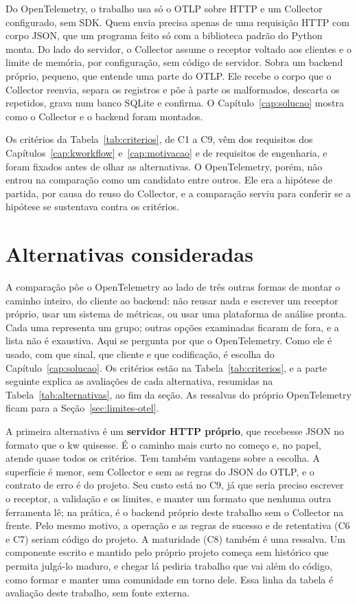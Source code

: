 Do OpenTelemetry, o trabalho usa só o OTLP sobre HTTP e um Collector
configurado, sem SDK. Quem envia precisa apenas de uma requisição HTTP com
corpo JSON, que um programa feito só com a biblioteca padrão do Python monta.
Do lado do servidor, o Collector assume o receptor voltado aos clientes e o
limite de memória, por configuração, sem código de servidor. Sobra um backend
próprio, pequeno, que entende uma parte do OTLP. Ele recebe o corpo que o Collector
reenvia, separa os registros e põe à parte os malformados, descarta os
repetidos, grava num banco SQLite e confirma. O Capítulo~\ref{cap:solucao}
mostra como o Collector e o backend foram montados.

Os critérios da Tabela~\ref{tab:criterios}, de C1 a C9, vêm dos requisitos dos
Capítulos~\ref{cap:kworkflow} e~\ref{cap:motivacao} e de requisitos de
engenharia, e foram fixados antes de olhar as alternativas. O
OpenTelemetry, porém, não entrou na comparação como um candidato entre
outros. Ele era a hipótese de partida, por causa do reuso do Collector, e a
comparação serviu para conferir se a hipótese se sustentava contra os
critérios.



\section{Alternativas consideradas}
\label{sec:alternativas}

A comparação põe o OpenTelemetry ao lado de três outras formas de montar o
caminho inteiro, do cliente ao backend: não reusar nada e escrever um
receptor próprio, usar um sistema de métricas, ou usar uma plataforma de
análise pronta. Cada uma representa um grupo; outras opções examinadas
ficaram de fora, e a lista não é exaustiva. Aqui se pergunta por que o
OpenTelemetry. Como ele é usado, com que sinal, que cliente e que
codificação, é escolha do Capítulo~\ref{cap:solucao}. Os critérios estão na
Tabela~\ref{tab:criterios}, e a parte seguinte explica as avaliações de cada
alternativa, resumidas na Tabela~\ref{tab:alternativas}, ao fim da seção. As
ressalvas do próprio OpenTelemetry ficam para a Seção~\ref{sec:limites-otel}.


A primeira alternativa é um \textbf{servidor HTTP próprio}, que recebesse JSON
no formato que o kw quisesse. É o caminho mais curto no começo e, no papel,
atende quase todos os critérios. Tem também vantagens sobre a escolha. A
superfície é menor, sem Collector e sem as regras do JSON do OTLP, e o
contrato de erro é do projeto. Seu custo está no C9, já que seria preciso escrever o
receptor, a validação e os limites, e manter um formato que nenhuma outra
ferramenta lê; na prática, é o backend próprio deste trabalho sem o Collector
na frente. Pelo mesmo motivo, a operação e as regras de sucesso e de
retentativa (C6 e C7) seriam código do projeto. A maturidade (C8) também é uma
ressalva. Um componente escrito e mantido pelo próprio projeto começa sem
histórico que permita julgá-lo maduro, e chegar lá pediria trabalho que vai
além do código, como formar e manter uma comunidade em torno dele. Essa linha
da tabela é avaliação deste trabalho, sem fonte externa.

